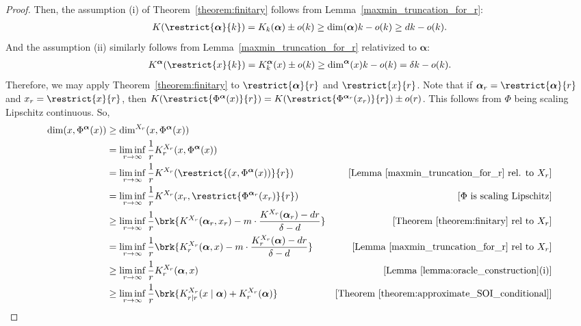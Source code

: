 \begin{proof}
    Then, the assumption (i) of Theorem~\ref{theorem:finitary} follows from Lemma~\ref{maxmin_truncation_for_r}:
    \begin{align*}
        K(\restrict{\boldsymbol{\alpha}}{k}) = K_k(\boldsymbol{\alpha}) \pm o(k) \geq \dim(\boldsymbol{\alpha}) k - o(k) \geq dk - o(k).
    \end{align*}
    And the assumption (ii) similarly follows from Lemma~\ref{maxmin_truncation_for_r} relativized to $\boldsymbol{\alpha}$:
    \begin{align*}
        K^{\boldsymbol{\alpha}}(\restrict{x}{k}) = K^{\boldsymbol{\alpha}}_k(x) \pm o(k) \geq \dim^{\boldsymbol{\alpha}}(x) k - o(k) = \delta k - o(k).
    \end{align*}
    Therefore, we may apply Theorem~\ref{theorem:finitary} to $\restrict{\boldsymbol{\alpha}}{r}$ and $\restrict{x}{r}$. Note that if $\boldsymbol{\alpha}_r = \restrict{\boldsymbol{\alpha}}{r}$ and $x_r = \restrict{x}{r}$, then $K(\restrict{\Phi^{\boldsymbol{\alpha}}(x)}{r}) = K(\restrict{\Phi^{\boldsymbol{\alpha}_r}(x_r)}{r}) \pm o(r)$. This follows from $\Phi$ being scaling Lipschitz continuous. So,
    \begin{align*}
        \dim(x, \Phi^{\boldsymbol{\alpha}}(x)) &\geq \dim^{X_r}(x, \Phi^{\boldsymbol{\alpha}}(x))\\
            &= \liminf_{r \to \infty} \frac{1}{r} K^{X_r}_r(x, \Phi^{\boldsymbol{\alpha}}(x))\\
            &= \liminf_{r \to \infty} \frac{1}{r} K^{X_r}(\restrict{(x, \Phi^{\boldsymbol{\alpha}}(x))}{r}) & [\text{Lemma~\ref{maxmin_truncation_for_r} rel. to $X_r$}]\\
            &= \liminf_{r \to \infty} \frac{1}{r} K^{X_r}(x_r, \restrict{\Phi^{\boldsymbol{\alpha}_r}(x_r)}{r}) & [\text{$\Phi$ is scaling Lipschitz}]\\
            &\geq \liminf_{r \to \infty} \frac{1}{r} \brk{K^{X_r}(\boldsymbol{\alpha}_r, x_r) - m \cdot \frac{K^{X_r}(\boldsymbol{\alpha}_r) - dr}{\delta - d}} & \text{[Theorem~\ref{theorem:finitary} rel to $X_r$]}\\
            &= \liminf_{r \to \infty} \frac{1}{r} \brk{K^{X_r}_r(\boldsymbol{\alpha}, x) - m \cdot \frac{K^{X_r}_r(\boldsymbol{\alpha}) - dr}{\delta - d}} & \text{[Lemma~\ref{maxmin_truncation_for_r} rel to $X_r$]}\\
            &\geq \liminf_{r \to \infty} \frac{1}{r} K^{X_r}_r(\boldsymbol{\alpha}, x) & [\text{Lemma~\ref{lemma:oracle_construction}(i)}]\\
            &\geq \liminf_{r \to \infty} \frac{1}{r} \brk{K^{X_r}_{r \mid r}(x \mid \boldsymbol{\alpha}) + K^{X_r}_r(\boldsymbol{\alpha})} & [\text{Theorem~\ref{theorem:approximate_SOI_conditional}}]\\

\end{align*}
\end{proof}
